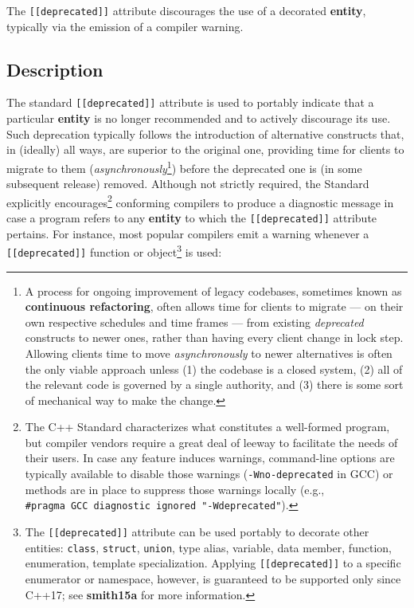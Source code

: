 
The \texttt{[[deprecated]]} attribute discourages the use of a decorated
\textbf{entity}, typically via the emission of a compiler warning.

\subsection[Description]{Description}\label{description}

The standard \texttt{[[deprecated]]} attribute is used to portably
indicate that a particular \textbf{entity} is no longer recommended and
to actively discourage its use. Such deprecation typically follows the
introduction of alternative constructs that, in (ideally) all ways, are
superior to the original one, providing time for clients to migrate to
them (\emph{asynchronously}{\cprotect\footnote{A process for ongoing
improvement of legacy codebases, sometimes known as
\textbf{continuous refactoring}, often allows time for clients to
migrate --- on their own respective schedules and time frames --- from
existing \emph{deprecated} constructs to newer ones, rather than
having every client change in lock step. Allowing clients time to move
\emph{asynchronously} to newer alternatives is often the only viable
approach unless (1) the codebase is a closed system, (2) all of the
relevant code is governed by a single authority, and (3) there is some
  sort of mechanical way to make the change.}}) before the deprecated
one is (in some subsequent release) removed. Although not strictly
required, the Standard explicitly encourages{\cprotect\footnote{The C++
Standard characterizes what constitutes a well-formed program, but
compiler vendors require a great deal of leeway to facilitate the
needs of their users. In case any feature induces warnings,
command-line options are typically available to disable those warnings
(\texttt{-Wno-deprecated} in GCC) or methods are in place to suppress those warnings
locally (e.g.,
  \texttt{\#pragma}~\texttt{GCC}~\texttt{diagnostic}~\texttt{ignored}~\texttt{"-Wdeprecated"}).}}
conforming compilers to produce a diagnostic message in case a program
refers to any \textbf{entity} to which the \texttt{[[deprecated]]}
attribute pertains. For instance, most popular compilers emit a
warning whenever a \texttt{[[deprecated]]} function or
object{\cprotect\footnote{The \texttt{[[deprecated]]} attribute can be
used portably to decorate other entities: \texttt{class},
\texttt{struct}, \texttt{union}, type alias, variable, data member,
function, enumeration, template specialization. Applying
\texttt{[[deprecated]]} to a specific enumerator or namespace,
however, is guaranteed to be supported only since C++17; see
  \textbf{smith15a} for more information.}} is used:

